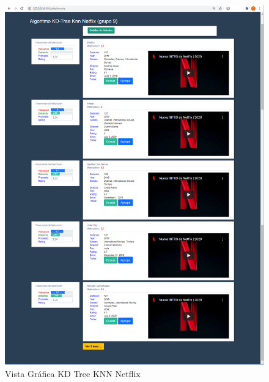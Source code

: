 \documentclass{article}
\begin{document}
	    \begin{figure}[H]
    			\centering
    			\includegraphics[scale=0.40]{img/vista_netflix_03.png}
    			\caption{Vista Gráfica KD Tree KNN Netflix}
    			\label{fig:netflix3}
    		\end{figure}
	
    \newpage
    
	
    \nocite{*}
    
	
	\newpage
	
	\lstlistoflistings	
		
	
\end{document}
